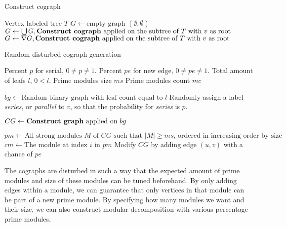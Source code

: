 \documentclass{amsart}
\begin{document}
\begin{algorithm}[H]
    \caption{Construct cograph}
   \begin{algorithmic}[1]
        \REQUIRE Vertex labeled tree $T$
        \ENDIF
        \STATE $G \leftarrow \text{empty graph $(\emptyset,\emptyset)$}$
                \STATE $G \leftarrow \bigcup G, \text{\textbf{Construct cograph} applied
                on the subtree of $T$ with $v$ as root} $
                \STATE $G \leftarrow \nabla G, \text{\textbf{Construct cograph} applied
                on the subtree of $T$ with $v$ as root}$
            \ENDIF
        \ENDFOR
    \end{algorithmic}
\end{algorithm}

\begin{algorithm}[H]
    \caption{Random disturbed cograph generation}
  \label{alg:RDCG}
  \begin{algorithmic}[1]
      \REQUIRE Percent $p$ for serial, $0 \neq p \neq 1$.
      \REQUIRE Percent $pe$ for new  edge, $0 \neq pe \neq 1$.
      \REQUIRE Total amount of leafs $l$, $0 < l$.
      \REQUIRE Prime modules size $ms$
      \REQUIRE Prime modules count $mc$

      \STATE $bg \leftarrow \text{Random binary graph with leaf count equal to $l$}$
        \STATE Randomly assign a label  \textit{series}, or \textit{parallel} to $v$, so
        that the probability for \textit{series} is $p$.
      \ENDFOR

      \STATE $CG \leftarrow \text{\textbf{Construct graph} applied on $bg$}$

      \STATE $pm \leftarrow \text{All strong modules $M$ of $CG$ such that $|M| \geq ms$, ordered in increasing order by size}$
        \STATE $cm \leftarrow \text{The module at index $i$ in $pm$}$
            \STATE Modify $CG$ by adding edge $(u,v)$ with a chance of $pe$
        \ENDFOR
      \ENDFOR
  \end{algorithmic}
\end{algorithm}

The cographs are disturbed in such a way that the expected amount of prime
modules and size of these modules can be tuned beforehand. By only adding edges
within a module, we can guarantee that only vertices in that module can be part
of a new prime module. By specifying how many modules we want and their size, we
can also construct modular decomposition with various percentage prime modules.
\end{document}
